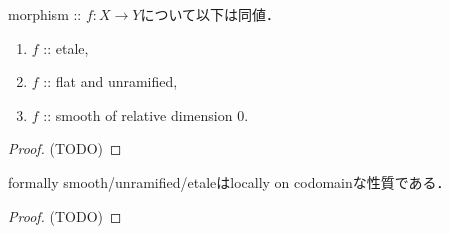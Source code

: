 \documentclass[a4paper, dvipdfmx]{jsarticle}
\begin{document}
\begin{Thm} \label{thm:etale_equiv}
    morphism :: $f \colon X \to Y$について以下は同値．
    \begin{enumerate}
        \item $f$ :: etale,
        \item $f$ :: flat and unramified, 
        \item $f$ :: smooth of relative dimension $0$.
    \end{enumerate}
\end{Thm}
\begin{proof}
    (TODO)
\end{proof}

\begin{Prop}
    formally smooth/unramified/etaleはlocally on codomainな性質である．
\end{Prop}
\begin{proof}
    (TODO)
\end{proof}
\end{document}
